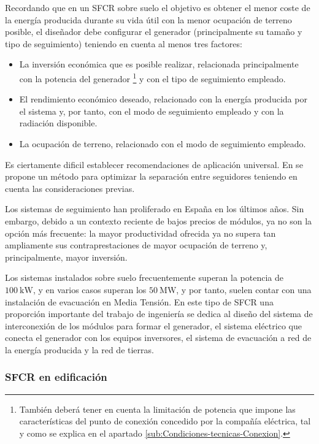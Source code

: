 Recordando que en un SFCR sobre suelo el objetivo es obtener el menor
coste de la energía producida durante su vida útil con la menor ocupación
de terreno posible, el diseñador debe configurar el generador (principalmente
su tamaño y tipo de seguimiento) teniendo en cuenta al menos tres
factores:
\begin{itemize}
\item La inversión económica que es posible realizar, relacionada principalmente
con la potencia del generador%
\footnote{También deberá tener en cuenta la limitación de potencia que impone
las características del punto de conexión concedido por la compañía
eléctrica, tal y como se explica en el apartado \ref{sub:Condiciones-tecnicas-Conexion}.%
} y con el tipo de seguimiento empleado.
\item El rendimiento económico deseado, relacionado con la energía producida
por el sistema y, por tanto, con el modo de seguimiento empleado y
con la radiación disponible. 
\item La ocupación de terreno, relacionado con el modo de seguimiento empleado.
\end{itemize}
Es ciertamente dificil establecer recomendaciones de aplicación
universal. En \cite{Perpinan2012} se propone un método para optimizar
la separación entre seguidores teniendo en cuenta las consideraciones
previas.

Los sistemas de seguimiento han proliferado en España en los últimos
años. Sin embargo, debido a un contexto reciente de bajos precios de
módulos, ya no son la opción más frecuente: la mayor productividad
ofrecida ya no supera tan ampliamente sus contraprestaciones de mayor
ocupación de terreno y, principalmente, mayor inversión.

Los sistemas instalados sobre suelo frecuentemente superan la potencia
de $\SI{100}{\kilo\watt}$, y en varios casos superan los $\SI{50}{\mega\watt}$,
y por tanto, suelen contar con una instalación de evacuación en Media
Tensión. En este tipo de SFCR una proporción importante del trabajo
de ingeniería se dedica al diseño del sistema de interconexión de los
módulos para formar el generador, el sistema eléctrico que conecta
el generador con los equipos inversores, el sistema de evacuación
a red de la energía producida y la red de tierras.


\subsubsection{SFCR en edificación}

